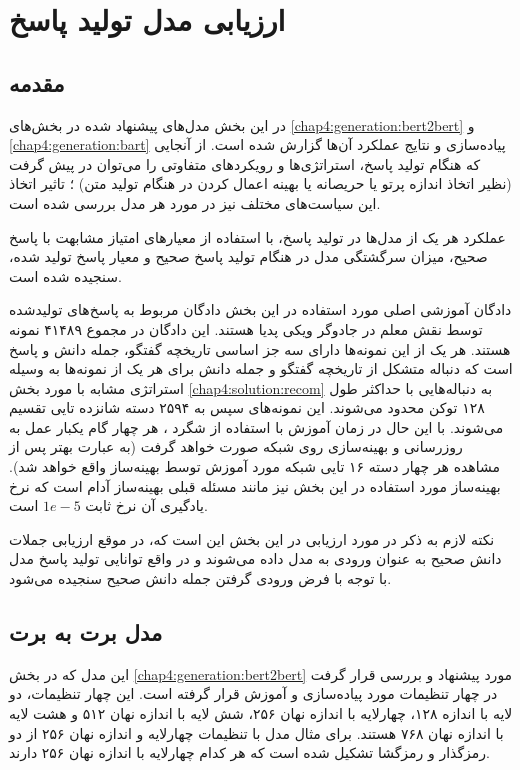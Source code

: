 \section{ارزیابی مدل تولید پاسخ}

\subsection{مقدمه}
در این بخش مدل‌های پیشنهاد شده در بخش‌های 
\ref{chap4:generation:bert2bert}
و
\ref{chap4:generation:bart}
پیاده‌سازی و نتایج عملکرد آن‌ها گزارش شده است. از آنجایی که هنگام تولید پاسخ، استراتژی‌ها و رویکرد‌های متفاوتی را می‌توان در پیش گرفت (نظیر اتخاذ اندازه پرتو یا حریصانه یا بهینه اعمال کردن در هنگام تولید متن) ؛ تاثیر اتخاذ این سیاست‌های مختلف نیز در مورد هر مدل بررسی شده است.

عملکرد هر یک از مدل‌ها در تولید پاسخ، با استفاده از معیار‌های امتیاز مشابهت
با پاسخ صحیح، میزان سرگشتگی مدل در هنگام تولید پاسخ صحیح و معیار
پاسخ تولید شده، سنجیده شده است.

دادگان آموزشی اصلی مورد استفاده در این بخش دادگان  مربوط به پاسخ‌های تولیدشده توسط نقش معلم در جادوگر ویکی پدیا هستند. این دادگان در مجموع ۴۱۴۸۹ نمونه هستند. هر یک از این نمونه‌ها دارای سه جز اساسی تاریخچه گفتگو، جمله دانش و پاسخ است که دنباله متشکل از تاریخچه گفتگو و جمله دانش برای هر یک از نمونه‌ها به وسیله استراتژی مشابه با مورد بخش
\ref{chap4:solution:recom}
به دنباله‌هایی با حداکثر طول ۱۲۸ توکن محدود می‌شوند. این نمونه‌های سپس به ۲۵۹۴ دسته شانزده تایی تقسیم می‌شوند. با این حال در زمان آموزش با استفاده از شگرد 
، هر چهار گام یکبار عمل به روزرسانی و بهینه‌سازی روی شبکه صورت خواهد گرفت (به عبارت بهتر پس از مشاهده هر چهار دسته ۱۶ تایی شبکه مورد آموزش توسط بهینه‌ساز واقع خواهد شد). بهینه‌ساز مورد استفاده در این بخش نیز مانند مسئله قبلی بهینه‌ساز آدام است که نرخ یادگیری آن نرخ ثابت 
$1e-5$
است. 

نکته لازم به ذکر در مورد ارزیابی در این بخش این است که، در موقع ارزیابی جملات دانش صحیح به عنوان ورودی به مدل داده‌ می‌شوند و در واقع توانایی تولید پاسخ مدل با توجه با فرض ورودی گرفتن جمله دانش صحیح سنجیده می‌شود. 

\subsection{مدل برت به برت}
این مدل که در بخش 
\ref{chap4:generation:bert2bert}
مورد پیشنهاد و بررسی قرار گرفت در چهار تنظیمات مورد پیاده‌سازی و آموزش قرار گرفته است. این چهار تنظیمات، دو لایه با اندازه ۱۲۸، چهارلایه با اندازه نهان ۲۵۶، شش لایه با اندازه نهان ۵۱۲ و هشت لایه با اندازه نهان ۷۶۸ هستند. برای مثال مدل با تنظیمات چهارلایه و اندازه نهان ۲۵۶ از دو رمزگذار و رمزگشا تشکیل شده است که هر کدام چهارلایه با اندازه نهان ۲۵۶ دارند. 

